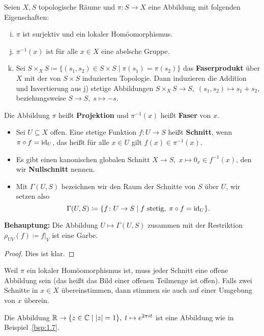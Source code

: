 \begin{bsp}
\label{bsp:1.7}
	Seien $X,S$ topologische Räume und $\pi\colon S\to X$ eine Abbildung mit folgenden Eigenschaften:
	\begin{enumerate}[a)]
		\setcounter{enumi}{8}
		\item $\pi$ ist surjektiv und ein lokaler Homöomorphismus.
		\item $\pi^{-1}(x)$ ist für alle $x\in X$ eine abelsche Gruppe.
		\item Sei $S\times_X S\coloneqq \{(s_1,s_2) \in S \times S \mid \pi(s_1)=\pi(s_2)\}$ das \textbf{Faserprodukt} über $X$ mit der von $S \times S$ induzierten Topologie. Dann induzieren die Addition und Invertierung aus j) stetige Abbildungen $S\times_X S \to S,\; (s_1,s_2) \mapsto s_1+s_2$, beziehungsweise $S \to S,\; s \mapsto -s$.
	\end{enumerate}
	Die Abbildung $\pi$ heißt \textbf{Projektion} und $\pi^{-1}(x)$ heißt \textbf{Faser} von $x$.
	\begin{itemize}
		\item Sei $U \subseteq X$ offen. Eine stetige Funktion $f\colon U \to S$ heißt \textbf{Schnitt}, wenn $\pi \circ f = \operatorname{id}_U$, das heißt für alle $x \in U$ gilt $f(x) \in \pi^{-1}(x)$.
		\item Es gibt einen kanonischen globalen Schnitt $X \to S, \; x \mapsto 0_x \in f^{-1}(x)$, den wir \textbf{Nullschnitt} nennen.
		\item Mit $\Gamma(U,S)$ bezeichnen wir den Raum der Schnitte von $S$ über $U$, wir setzen also
		\[
			\Gamma(U,S) \coloneqq \{f\colon U\to S \mid f \text{ stetig},\; \pi\circ f = \operatorname{id}_U\}.
		\]
	\end{itemize}
	\textbf{Behauptung:} Die Abbildung $U \mapsto \Gamma(U,S)$ zusammen mit der Restriktion $\rho_{UV}(f) \coloneqq f\vert_V$ ist eine Garbe.
	\begin{proof}
		Dies ist klar.
	\end{proof}
\end{bsp}

\begin{bem}
	Weil $\pi$ ein lokaler Homöomorphismus ist, muss jeder Schnitt eine offene Abbildung sein (das heißt das Bild einer offenen Teilmenge ist offen). Falls zwei Schnitte in $x \in X$ übereinstimmen, dann stimmen sie auch auf einer Umgebung von $x$ überein.
\end{bem}

\begin{bsp*}
	Die Abbildung $\mathbb {R} \to \{z\in \mathbb {C} \mid \left \lvert z \right \rvert = 1\},\; t \mapsto e^{2 \pi i t}$ ist eine Abbildung wie in Beispiel~\ref{bsp:1.7}.
\end{bsp*}

